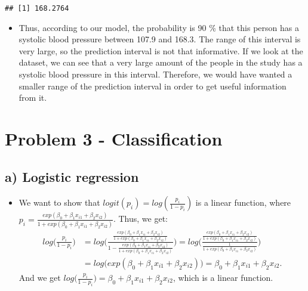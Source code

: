\documentclass[]{article}
\providecommand{\tightlist}{%
  \setlength{\itemsep}{0pt}\setlength{\parskip}{0pt}}
\begin{document}
\begin{verbatim}
## [1] 168.2764
\end{verbatim}

\begin{itemize}
\tightlist
\item
  Thus, according to our model, the probability is 90 \% that this
  person has a systolic blood pressure between 107.9 and 168.3. The
  range of this interval is very large, so the prediction interval is
  not that informative. If we look at the dataset, we can see that a
  very large amount of the people in the study has a systolic blood
  pressure in this interval. Therefore, we would have wanted a smaller
  range of the prediction interval in order to get useful information
  from it.
\end{itemize}

\section{Problem 3 - Classification}\label{problem-3---classification}

\subsection{a) Logistic regression}\label{a-logistic-regression}

\begin{itemize}
\tightlist
\item
  We want to show that \(logit(p_i) = log(\frac{p_i}{1-p_i})\) is a
  linear function, where
  \(p_i = \frac{exp(\beta_0 + \beta_1 x_{i1} + \beta_2 x_{i2})}{1+exp(\beta_0 + \beta_1 x_{i1} + \beta_2 x_{i2})}\).
  Thus, we get: \[
  \begin{split}
  log \Big(\frac{p_i}{1-p_i}\Big) &= log \Bigg(\frac{\frac{exp(\beta_0 + \beta_1 x_{i1} + \beta_2 x_{i2})}{1+exp(\beta_0 + \beta_1 x_{i1} + \beta_2 x_{i2})}}{1-\frac{exp(\beta_0 + \beta_1 x_{i1} + \beta_2 x_{i2})}{1+exp(\beta_0 + \beta_1 x_{i1} + \beta_2 x_{i2})}} \Bigg)= log \Bigg(\frac{\frac{exp(\beta_0 + \beta_1 x_{i1} + \beta_2 x_{i2})}{1+exp(\beta_0 + \beta_1 x_{i1} + \beta_2 x_{i2})}}{\frac{1}{1+exp(\beta_0 + \beta_1 x_{i1} + \beta_2 x_{i2})}} \Bigg) \\ 
  &= log \Bigg(exp(\beta_0 + \beta_1 x_{i1} + \beta_2 x_{i2}) \Bigg) = \beta_0 + \beta_1 x_{i1} + \beta_2 x_{i2}.
  \end{split}
  \] And we get
  \(log \Big(\frac{p_i}{1-p_i}\Big) = \beta_0 + \beta_1 x_{i1} + \beta_2 x_{i2}\),
  which is a linear function.
\end{itemize}
\end{document}
